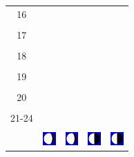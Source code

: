 \documentclass[a4paper,12pt, tikz]{scrartcl}
\begin{document}
\begin{tabularx}{\linewidth}{|c|X|X|p{2cm}|p{2cm}|}
            &   &       &    &   \\
          \hline
          16&   &                 &    &   \\
            &   &       &    &   \\
          \hline
          17&   &                 &    &   \\
            &   &       &    &   \\
          \hline
          18&   &                 &    &   \\
            &   &       &    &   \\
          \hline
          19&   &                 &     &   \\
            &   &       &    &   \\
          \hline
          20&   &              &    &   \\
            &   &       &    &   \\
          \hline 
          21-24&   &              &    &   \\
            &   &       &    &   \\
          \hline
                      & \vspace{0.01cm} \centerline{\includegraphics[width=0.5cm]{moon_phases/Moon_phase_5.svg.png}} \vspace{0.1cm} & \vspace{0.01cm} \centerline{\includegraphics[width=0.5cm]{moon_phases/Moon_phase_5.svg.png}} \vspace{0.1cm} & \vspace{0.01cm} \centerline{\includegraphics[width=0.5cm]{moon_phases/Moon_phase_6.svg.png}} \vspace{0.1cm} & \vspace{0.01cm} \centerline{\includegraphics[width=0.5cm]{moon_phases/Moon_phase_6.svg.png}} \vspace{0.1cm}\\
          \hline    
        \end{tabularx}
\end{document}
